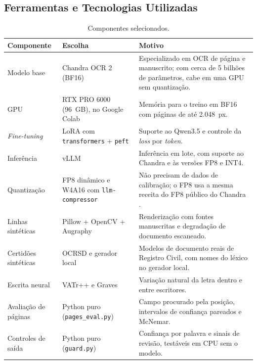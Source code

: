 \subsection{Ferramentas e Tecnologias Utilizadas}

\begin{table}[H]
\centering
\small
\begin{tabular}{@{}p{3.4cm}p{5.2cm}p{6.0cm}@{}}
\toprule
Componente & Escolha & Motivo \\
\midrule
Modelo base & Chandra OCR 2 (BF16) \cite{chandra2026} & Especializado em OCR de página e manuscrito; com cerca de 5 bilhões de parâmetros, cabe em uma GPU sem quantização. \\
GPU & RTX PRO 6000 (96~GB), no Google Colab & Memória para o treino em BF16 com páginas de até 2.048~px. \\
\emph{Fine-tuning} & LoRA com \texttt{transformers} + \texttt{peft} \cite{peft2022} & Suporte ao Qwen3.5 e controle da \emph{loss} por \emph{token}. \\
Inferência & vLLM \cite{vllm2023} & Inferência em lote, com suporte ao Chandra e às versões FP8 e INT4. \\
Quantização & FP8 dinâmico e W4A16 com \texttt{llm-compressor} \cite{llmcompressor} & Não precisam de dados de calibração; o FP8 usa a mesma receita do FP8 público do Chandra \cite{chandrafp8}. \\
Linhas sintéticas & Pillow + OpenCV + Augraphy \cite{augraphy2022} & Renderização com fontes manuscritas e degradação de documento escaneado. \\
Certidões sintéticas & OCRSD \cite{ocrsd} e gerador local & Modelos de documento reais de Registro Civil, com nomes do léxico no gerador local. \\
Escrita neural & VATr++ \cite{vatrpp2024} e Graves \cite{graves2013} & Variação natural da letra dentro e entre escritores. \\
Avaliação de páginas & Python puro (\texttt{pages\_eval.py}) & Campo procurado pela posição, intervalos de confiança pareados e McNemar. \\
Controles de saída & Python puro (\texttt{guard.py}) & Confiança por palavra e sinais de revisão, testáveis em CPU sem o modelo. \\
\bottomrule
\end{tabular}
\caption{Componentes selecionados.}
\end{table}

